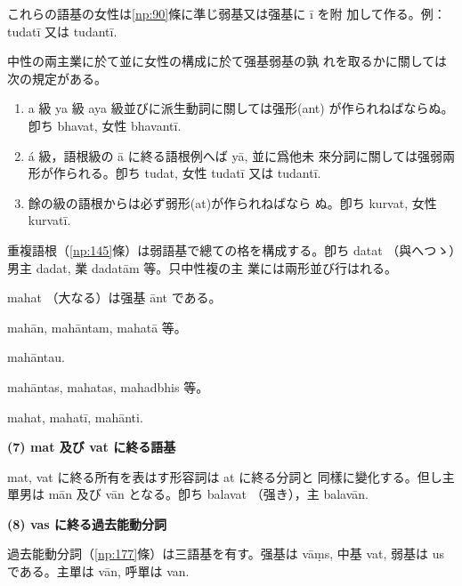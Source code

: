 \numberParagraph
これらの語基の女性は\ref{np:90}條に準じ弱基又は强基に ī を附
加して作る。例：tudatī 又は tudantī.

\numberParagraph \label{np:90}
中性の兩主業に於て並に女性の構成に於て强基弱基の孰
れを取るかに關しては次の規定がある。
\begin{enumerate}[label=(\alph*)]
\item a 級 ya 級 aya 級並びに派生動詞に關しては强形(ant)
  が作られねばならぬ。卽ち bhavat, 女性 bhavantī.
\item á 級，語根級の ā に終る語根例へば yā, 並に爲他未
  來分詞に關しては强弱兩形が作られる。卽ち tudat, 女性
  tudatī 又は tudantī.
\item 餘の級の語根からは必ず弱形(at)が作られねばなら
  ぬ。卽ち kurvat, 女性 kurvatī.
\end{enumerate}

\numberParagraph
重複語根（\ref{np:145}條）は弱語基で總ての格を構成する。卽ち
datat （與へつゝ）男主 dadat, 業 dadatām 等。只中性複の主
業には兩形並び行はれる。

\numberParagraph
mahat （大なる）は强基 ānt である。
\begin{description}[font=\normalfont]
\item[男，單] mahān, mahāntam, mahatā 等。
\item[兩] mahāntau.
\item[複] mahāntas, mahatas, mahadbhis 等。
\item[中] mahat, mahatī, mahānti.
\end{description}

\begin{center}\textbf{(7) mat 及び vat に終る語基}\end{center}

\numberParagraph
mat, vat に終る所有を表はす形容詞は at に終る分詞と
同樣に變化する。但し主單男は mān 及び vān となる。卽ち
balavat （强き），主 balavān.

\begin{center}\textbf{(8) vas に終る過去能動分詞}\end{center}

\numberParagraph
過去能動分詞（\ref{np:177}條）は三語基を有す。强基は vāṃs,
中基 vat, 弱基は us である。主單は vān, 呼單は van.

